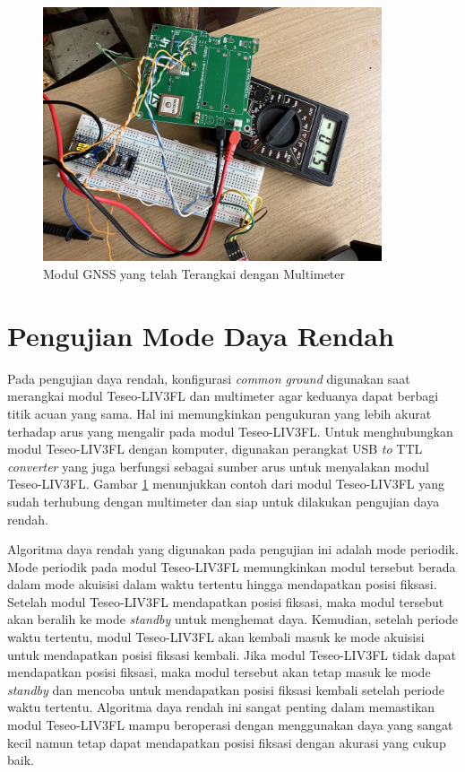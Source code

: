 \begin{figure}[H]
	\centering
	\includegraphics[width=10cm]{contents/chapter-4/low-power.jpg}
	\caption{Modul GNSS yang telah Terangkai dengan Multimeter}
	\label{Fig: low-power-connected}
\end{figure}

\section{Pengujian Mode Daya Rendah}
Pada pengujian daya rendah, konfigurasi \textit{common ground} digunakan saat merangkai modul Teseo\hyp{}LIV3FL dan multimeter agar keduanya dapat berbagi titik acuan yang sama. Hal ini memungkinkan pengukuran yang lebih akurat terhadap arus yang mengalir pada modul Teseo\hyp{}LIV3FL. Untuk menghubungkan modul Teseo\hyp{}LIV3FL dengan komputer, digunakan perangkat USB \textit{to} TTL \textit{converter} yang juga berfungsi sebagai sumber arus untuk menyalakan modul Teseo\hyp{}LIV3FL. Gambar \ref{Fig: low-power-connected} menunjukkan contoh dari modul Teseo\hyp{}LIV3FL yang sudah terhubung dengan multimeter dan siap untuk dilakukan pengujian daya rendah.

Algoritma daya rendah yang digunakan pada pengujian ini adalah mode periodik. Mode periodik pada modul Teseo\hyp{}LIV3FL memungkinkan modul tersebut berada dalam mode akuisisi dalam waktu tertentu hingga mendapatkan posisi fiksasi. Setelah modul Teseo\hyp{}LIV3FL mendapatkan posisi fiksasi, maka modul tersebut akan beralih ke mode \textit{standby} untuk menghemat daya. Kemudian, setelah periode waktu tertentu, modul Teseo\hyp{}LIV3FL akan kembali masuk ke mode akuisisi untuk mendapatkan posisi fiksasi kembali. Jika modul Teseo\hyp{}LIV3FL tidak dapat mendapatkan posisi fiksasi, maka modul tersebut akan tetap masuk ke mode \textit{standby} dan mencoba untuk mendapatkan posisi fiksasi kembali setelah periode waktu tertentu. Algoritma daya rendah ini sangat penting dalam memastikan modul Teseo\hyp{}LIV3FL mampu beroperasi dengan menggunakan daya yang sangat kecil namun tetap dapat mendapatkan posisi fiksasi dengan akurasi yang cukup baik.

